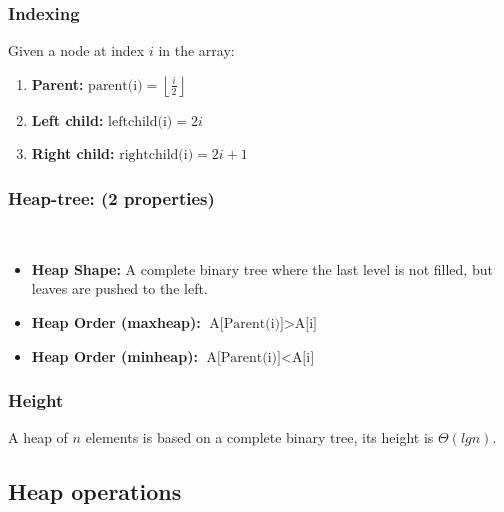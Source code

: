     \subsubsection{Indexing}
    \begin{definition}
        Given a node at index $i$ in the array:

        \begin{enumerate}
            \item \textbf{Parent:} $\text{parent(i)} = \left \lfloor \frac{i}{2} \right \rfloor$
            \item \textbf{Left child:} $\text{leftchild(i)} = 2i$
            \item \textbf{Right child:} $\text{rightchild(i)} = 2i+1$
        \end{enumerate}
    \end{definition}


    \subsubsection{Heap-tree: (2 properties)}\
    \begin{definition}
        \begin{itemize}
            \item \textbf{Heap Shape:} A complete binary tree where the last level is not filled, but leaves are pushed to the left.
            \item \textbf{Heap Order (maxheap):} $\text{A[Parent(i)]} > \text{A[i]}$
            \item \textbf{Heap Order (minheap):} $\text{A[Parent(i)]} < \text{A[i]}$
        \end{itemize}
    \end{definition}

    \subsubsection{Height}
    \begin{definition}
        A heap of $n$ elements is based on a complete binary tree, its height is $\Theta(lg n)$.
    \end{definition}

\subsection{Heap operations}

